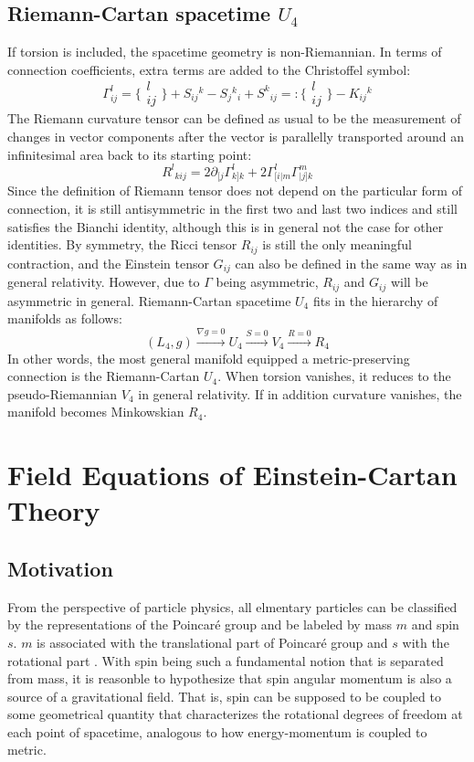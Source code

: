 \documentclass[12pt]{article}
\begin{document}
\subsection{Riemann-Cartan spacetime $U_4$}
If torsion is included, the spacetime geometry is non-Riemannian. In terms of connection coefficients, extra terms are added to the Christoffel symbol:
\[ \Gamma^l_{ij} = \{\substack{l\\ij}\} + S_{ij}{}^k - S_j{}^k{}_i + S^k{}_{ij} =: \{\substack{l\\ij}\} - K_{ij}{}^k \]
The Riemann curvature tensor can be defined as usual to be the measurement of changes in vector components after the vector is parallelly transported around an infinitesimal area back to its starting point:
\[ R^l{}_{kij} = 2\partial_{[j}\Gamma^l_{k]k} + 2\Gamma^l_{[i|m}\Gamma^m_{|j]k} \] 
Since the definition of Riemann tensor does not depend on the particular form of connection, it is still antisymmetric in the first two and last two indices and still satisfies the Bianchi identity, although this is in general not the case for other identities. By symmetry, the Ricci tensor $R_{ij}$ is still the only meaningful contraction, and the Einstein tensor $G_{ij}$ can also be defined in the same way as in general relativity. However, due to $\Gamma$ being asymmetric, $R_{ij}$ and $G_{ij}$ will be asymmetric in general. Riemann-Cartan spacetime $U_4$ fits in the hierarchy of manifolds as follows:
\[ (L_4, g) \xrightarrow{\nabla g = 0} U_4 \xrightarrow{S=0} V_4 \xrightarrow{R = 0} R_4\]
In other words, the most general manifold equipped a metric-preserving connection is the Riemann-Cartan $U_4$. When torsion vanishes, it reduces to the pseudo-Riemannian $V_4$ in general relativity. If in addition curvature vanishes, the manifold becomes Minkowskian $R_4$.

\section{Field Equations of Einstein-Cartan Theory}
\subsection{Motivation}
From the perspective of particle physics, all elmentary particles can be classified by the representations of the Poincar\'e group and be labeled by mass $m$ and spin $s$. $m$ is associated with the translational part of Poincar\'e group and $s$ with the rotational part \cite{hehl1976general}. With spin being such a fundamental notion that is separated from mass, it is reasonble to hypothesize that spin angular momentum is also a source of a gravitational field. That is, spin can be supposed to be coupled to some geometrical quantity that characterizes the rotational degrees of freedom at each point of spacetime, analogous to how energy-momentum is coupled to metric.
\end{document}
